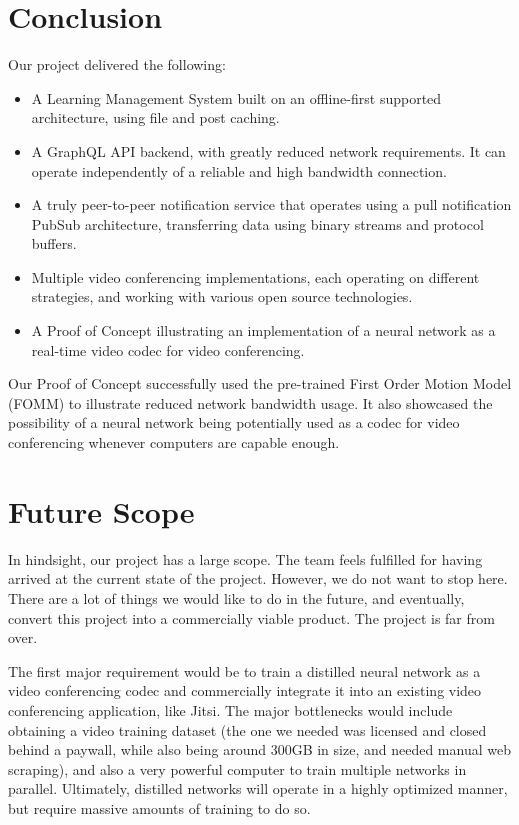 \section{Conclusion}
Our project delivered the following:
\begin{itemize}
    \item A Learning Management System built on an offline-first supported architecture, using file and post caching.
    \item A GraphQL API backend, with greatly reduced network requirements. It can operate independently of a reliable and high bandwidth connection.
    \item A truly peer-to-peer notification service that operates using a pull notification PubSub architecture, 
    transferring data using binary streams and protocol buffers.
    \item Multiple video conferencing implementations, each operating on different strategies, 
    and working with various open source technologies.
    \item A Proof of Concept illustrating an implementation of a neural network as a real-time video codec for video conferencing.
\end{itemize}

Our Proof of Concept successfully used the pre-trained First Order Motion Model (FOMM) to illustrate reduced
network bandwidth usage. It also showcased the possibility of a neural network being potentially used as a codec for video conferencing whenever computers are capable enough.

\section{Future Scope}
In hindsight, our project has a large scope. The team feels fulfilled for having arrived at the current state of the project. 
However, we do not want to stop here. There are a lot of things we would like to do in the future, and eventually, convert this project into a commercially viable product. The project is far from over.

The first major requirement would be to train a distilled neural network as a video conferencing codec and commercially integrate it into an existing video conferencing application, like Jitsi. The major bottlenecks would include obtaining a video training dataset 
(the one we needed was licensed and closed behind a paywall, while also being around 300GB in size, and needed manual web scraping), and also a very powerful computer to train multiple networks in parallel. 
Ultimately, distilled networks will operate in a highly optimized manner, but require massive amounts of training to do so.

